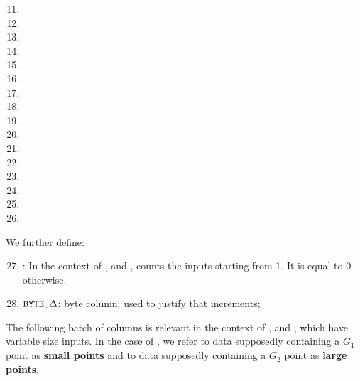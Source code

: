 \begin{multicols}{2}
    \begin{enumerate}
        \setcounter{enumi}{10}
        \item \isPointEvaluationData{}
        \item \isBlsGOneAddData{}
        \item \isBlsGOneMsmData{}
        \item \isBlsGTwoAddData{}
        \item \isBlsGTwoMsmData{}
        \item \isBlsPairingCheckData{}
        \item \isBlsMapFpToGOneData{}
        \item \isBlsMapFpTwoToGTwoData{}
        \item \isPointEvaluationResult{}
        \item \isBlsGOneAddResult{}
        \item \isBlsGOneMsmResult{}
        \item \isBlsGTwoAddResult{}
        \item \isBlsGTwoMsmResult{}
        \item \isBlsPairingCheckResult{}
        \item \isBlsMapFpToGOneResult{}
        \item \isBlsMapFpTwoToGTwoResult{}
    \end{enumerate}
\end{multicols}
\noindent We further define:
\begin{enumerate}[resume]
        \setcounter{enumi}{26}
    \item
        \accInputs:
        In the context of ,  and , counts the inputs starting from 1. It is equal to 0 otherwise.
    \item
        $\texttt{BYTE}\texttt{\_$\Delta$}$:
        byte column; used to justify that \blsId{} increments;
\end{enumerate}
The following batch of columns is relevant in the context of ,  and , which have variable size inputs.
In the case of , we refer to data supposedly containing a $G_1$ point as \textbf{small points} and to data supposedly containing a $G_2$ point as \textbf{large points}.

